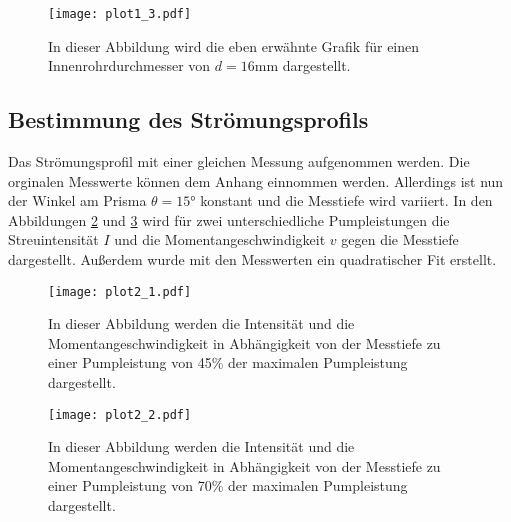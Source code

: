 \begin{figure}
  \centering
  \texttt{[image: plot1\_3.pdf]}
  \caption{In dieser Abbildung wird die eben erwähnte Grafik für einen Innenrohrdurchmesser  von $d = 16 \unit{\milli\metre}$ dargestellt.}
  \label{fig:plot1_3}
\end{figure}
\subsection{Bestimmung des Strömungsprofils}
\label{subsec:strömungsprofil}
Das Strömungsprofil mit einer gleichen Messung aufgenommen werden. Die orginalen Messwerte können dem Anhang einnommen werden. Allerdings ist nun der  Winkel am Prisma
$\theta = 15\unit{\degree}$ konstant und die Messtiefe wird variiert.
In den Abbildungen \ref{fig:plot2_1} und \ref{fig:plot2_2} wird für zwei unterschiedliche Pumpleistungen die Streuintensität $I$ und die Momentangeschwindigkeit $v$ gegen die 
Messtiefe dargestellt. Außerdem wurde mit den Messwerten ein quadratischer Fit erstellt. 

\begin{figure}
  \centering
  \texttt{[image: plot2\_1.pdf]}
  \caption{In dieser Abbildung werden die Intensität und die Momentangeschwindigkeit in Abhängigkeit von der Messtiefe zu einer Pumpleistung von 45\% der maximalen Pumpleistung dargestellt.}
  \label{fig:plot2_1}
\end{figure}

\begin{figure}
  \centering
  \texttt{[image: plot2\_2.pdf]}
  \caption{In dieser Abbildung werden die Intensität und die Momentangeschwindigkeit in Abhängigkeit von der Messtiefe zu einer Pumpleistung von 70\% der maximalen Pumpleistung dargestellt.}
  \label{fig:plot2_2}
\end{figure}
